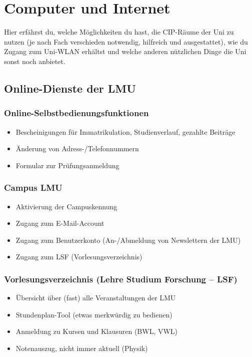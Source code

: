 ﻿\chapter{Computer und Internet}
Hier erfährst du, welche Möglichkeiten du hast, die CIP-Räume der Uni zu nutzen (je nach
Fach verschieden notwendig, hilfreich und ausgestattet), wie du Zugang zum Uni-WLAN erhältst 
und welche anderen nützlichen Dinge die Uni sonst noch anbietet.

\section{Online-Dienste der LMU}
\subsection*{Online-Selbstbedienungsfunktionen}
\begin{itemize}
	\item Bescheinigungen für Immatrikulation, Studienverlauf, gezahlte Beiträge
	\item Änderung von Adress-/Telefonnummern
	\item Formular zur Prüfungsanmeldung
\end{itemize}
\begin{urlList}
\end{urlList}

\subsection*{Campus LMU}
\begin{itemize}
	\item Aktivierung der Campuskennung
	\item Zugang zum E-Mail-Account
	\item Zugang zum Benutzerkonto (An-/Abmeldung von Newslettern der LMU)
	\item Zugang zum LSF (Vorlesungsverzeichnis)
\end{itemize}
\begin{urlList}
\end{urlList}

\subsection*{Vorlesungsverzeichnis (Lehre Studium Forschung -- LSF)}
\begin{itemize}
	\item Übersicht über (fast) alle Veranstaltungen der LMU
	\item Stundenplan-Tool (etwas merkwürdig zu bedienen)
	\item Anmeldung zu Kursen und Klausuren (BWL, VWL)
	\item Notenauszug, nicht immer aktuell (Physik)
\end{itemize}
\begin{urlList}
\end{urlList}

